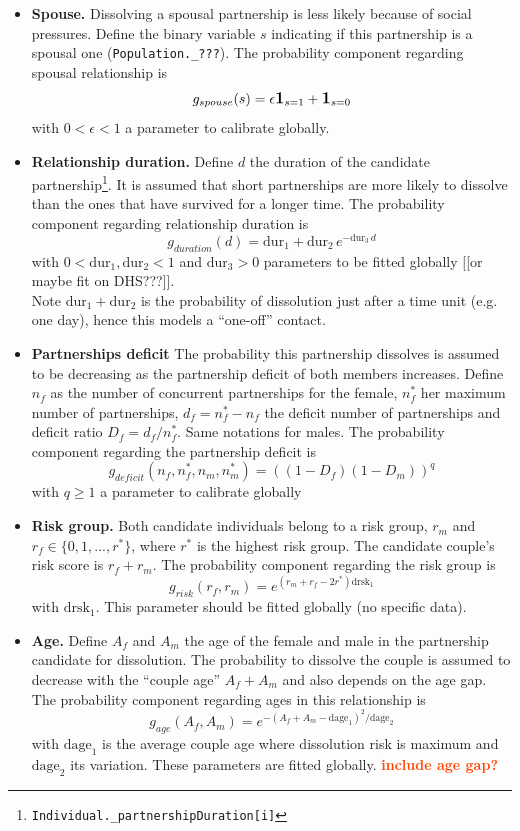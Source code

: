 \documentclass[11pt, onecolumn]{article}
\newcommand{\ttt}[1]{\texttt{#1}}
\newcommand{\one}[1]{\textbf{\large{1}}_{#1}}
\newcommand{\warning}[1]{\textbf{\textcolor{OrangeRed}{#1}}}
\begin{document}
\begin{itemize}
\item \textbf{Spouse.}
Dissolving a spousal partnership is less likely because of social pressures. Define the binary variable $s$ indicating if this partnership is a spousal one (\ttt{Population.\_???}). The probability component regarding spousal relationship is
$$g_{spouse}(s) = \epsilon \one{s=1}+ \one{s=0} $$
with $0<\epsilon<1$ a parameter to calibrate globally.


\item \textbf{Relationship duration.}
Define $d$ the duration of the candidate partnership\footnote{\ttt{Individual.\_partnershipDuration[i]}}. It is assumed that short partnerships are more likely to dissolve than the ones that have survived for a longer time. 
The probability component regarding relationship duration is
$$g_{duration}(d) =\mathrm{dur}_1 + \mathrm{dur}_2 \, e^{-\mathrm{dur}_3\, d}$$
with $0<\mathrm{dur}_1,\mathrm{dur}_2<1$ and $\mathrm{dur}_3>0$ parameters to be fitted globally [[or maybe fit on DHS???]].\\
Note $\mathrm{dur}_1+\mathrm{dur}_2$ is the probability of dissolution just after a time unit (e.g. one day), hence this models a ``one-off'' contact.  

\item \textbf{Partnerships deficit}
The probability this partnership dissolves is assumed to be decreasing as the partnership deficit of both members increases. Define $n_f$ as the number of concurrent partnerships for the female, $n^*_f$ her maximum number of partnerships, $d_f=n^*_f-n_f$ the deficit number of partnerships and deficit ratio $D_f=d_f/n^*_f$. Same notations for males. The probability component regarding the partnership deficit is
$$g_{deficit}(n_f,n^*_f,n_m,n^*_m) = ((1-D_f)(1- D_m))^q$$
with $q\geq 1$ a parameter to calibrate globally

\item \textbf{Risk group.}
Both candidate individuals belong to a risk group, $r_m$ and $r_f\in \{0,1,...,r^*\}$, where $r^*$ is the highest risk group. The candidate couple's risk score is $r_f+r_m$. The probability component regarding the risk group is
$$g_{risk}(r_f,r_m) = e^{(r_m+r_f-2r^*)\mathrm{drsk}_1}  $$
with $\mathrm{drsk}_1$. This parameter should be fitted globally (no specific data).


\item \textbf{Age.} 
Define $A_f$ and $A_m$ the age of the female and male in the partnership candidate for dissolution. The probability to dissolve the couple is assumed to decrease with the ``couple age'' $A_f+A_m$ and also depends on the age gap.
The probability component regarding ages in this relationship is
$$g_{age}(A_f,A_m) =e^{-(A_f+A_m-\mathrm{dage}_1)^2/\mathrm{dage}_2 }$$
with $\mathrm{dage}_1$ is the average couple age where dissolution risk is maximum and $\mathrm{dage}_2$ its variation. These parameters are fitted globally. \warning{include age gap?}


\end{itemize}
\end{document}
